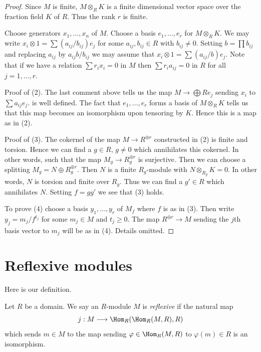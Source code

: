\begin{proof}
Since $M$ is finite, $M \otimes_R K$ is a finite dimensional
vector space over the fraction field $K$ of $R$. Thus the rank $r$ is finite.

\medskip\noindent
Choose generators $x_1, \ldots, x_n$ of $M$. Choose a basis
$e_1, \ldots, e_r$ for $M \otimes_R K$. We may write
$x_i \otimes 1 = \sum (a_{ij}/b_{ij}) e_j$ for  some
$a_{ij} , b_{ij} \in R$ with $b_{ij} \not = 0$. Setting
$b = \prod b_{ij}$ and replacing $a_{ij}$ by $a_{ij}b/b_{ij}$
we may assume that $x_i \otimes 1 = \sum (a_{ij}/b) e_j$.
Note that if we have a relation $\sum r_i x_i = 0$ in $M$
then $\sum r_ia_{ij} = 0$ in $R$ for all $j = 1, \ldots, r$.

\medskip\noindent
Proof of (2). The last comment above tells us the map
$M \to \bigoplus Re_j$ sending $x_i$ to $\sum a_{ij} e_j$.
is well defined. The fact that $e_1, \ldots, e_r$ forms a basis
of $M \otimes_R K$ tells us that this map becomes an
isomorphism upon tensoring by $K$. Hence this is a map as in (2).

\medskip\noindent
Proof of (3). The cokernel of the map $M \to R^{\oplus r}$
constructed in (2) is finite and torsion. Hence we can find
a $g \in R$, $g \not = 0$ which annihilates this cokernel.
In other words, such that the map $M_g \to R_g^{\oplus r}$
is surjective. Then we can choose a splitting
$M_g = N \oplus R_g^{\oplus r}$. Then $N$ is a finite
$R_g$-module with $N \otimes_{R_g} K = 0$. In other words,
$N$ is torsion and finite over $R_g$. Thus we can find
a $g' \in R$ which annihilates $N$. Setting $f= gg'$ we
see that (3) holds.

\medskip\noindent
To prove (4) choose a basis $y_1, \ldots, y_r$
of $M_f$ where $f$ is as in (3). Then write
$y_j = m_j/f^{t_j}$ for some $m_j \in M$ and
$t_j \geq 0$. The map $R^{\oplus r} \to M$ sending
the $j$th basis vector to $m_j$ will be as in (4).
Details omitted.
\end{proof}




\section{Reflexive modules}
\label{section-reflexive}

\noindent
Here is our definition.

\begin{definition}
\label{definition-reflexive}
Let $R$ be a domain. We say an $R$-module $M$ is {\it reflexive} if
the natural map
$$
j : M \longrightarrow \Hom_R(\Hom_R(M, R), R)
$$
which sends $m \in M$ to the map sending $\varphi \in \Hom_R(M, R)$
to $\varphi(m) \in R$ is an isomorphism.
\end{definition}

